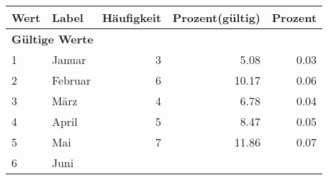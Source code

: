      \begin{longtable}{lXrrr}
     \toprule
     \textbf{Wert} & \textbf{Label} & \textbf{Häufigkeit} & \textbf{Prozent(gültig)} & \textbf{Prozent} \\
     \endhead
     \midrule
     \multicolumn{5}{l}{\textbf{Gültige Werte}}\\

     1 &
     \multicolumn{1}{X}{ Januar   } &


       \num{3} &
       \num[round-mode=places,round-precision=2]{5,08} &
         \num[round-mode=places,round-precision=2]{0,03} \\

     2 &
     \multicolumn{1}{X}{ Februar   } &


       \num{6} &
       \num[round-mode=places,round-precision=2]{10,17} &
         \num[round-mode=places,round-precision=2]{0,06} \\

     3 &
     \multicolumn{1}{X}{ März   } &


       \num{4} &
       \num[round-mode=places,round-precision=2]{6,78} &
         \num[round-mode=places,round-precision=2]{0,04} \\

     4 &
     \multicolumn{1}{X}{ April   } &


       \num{5} &
       \num[round-mode=places,round-precision=2]{8,47} &
         \num[round-mode=places,round-precision=2]{0,05} \\

     5 &
     \multicolumn{1}{X}{ Mai   } &


       \num{7} &
       \num[round-mode=places,round-precision=2]{11,86} &
         \num[round-mode=places,round-precision=2]{0,07} \\

     6 &
     \multicolumn{1}{X}{ Juni   } &



\end{longtable}
